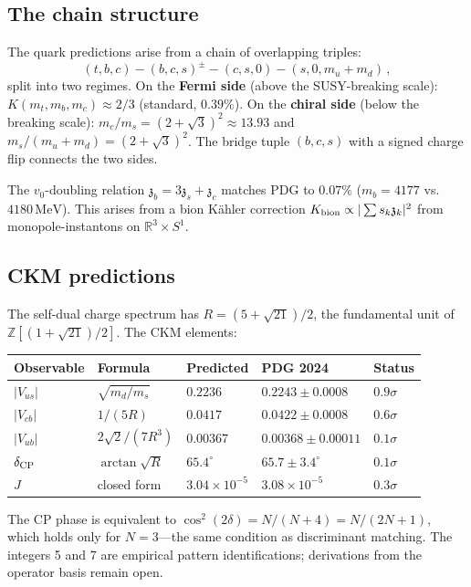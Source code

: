 \documentclass[12pt,a4paper]{article}
\newcommand{\MeV}{\,\mathrm{MeV}}
\newcommand{\zch}{\mathfrak{z}}
\begin{document}
\subsection{The chain structure}

The quark predictions arise from a chain of overlapping triples:
\begin{equation}
  (t,b,c) - (b,c,s)^{\pm} - (c,s,0) - (s,0,m_u{+}m_d)\,,
  \label{eq:chain}
\end{equation}
split into two regimes.
On the \textbf{Fermi side} (above the SUSY-breaking scale):
$K(m_t, m_b, m_c) \approx 2/3$ (standard, $0.39\%$).
On the \textbf{chiral side} (below the breaking scale):
$m_c/m_s = (2{+}\sqrt{3})^2 \approx 13.93$ and
$m_s/(m_u{+}m_d) = (2{+}\sqrt{3})^2$.
The bridge tuple $(b,c,s)$ with a signed charge flip connects
the two sides.

The $v_0$-doubling relation
$\zch_b = 3\zch_s + \zch_c$ matches
PDG to $0.07\%$ ($m_b = 4177$ vs.\ $4180\MeV$).
This arises from a bion K\"ahler correction
$K_{\rm bion} \propto |\sum s_k \zch_k|^2$ from
monopole-instantons on $\mathbb{R}^3 \times S^1$.

\subsection{CKM predictions}

The self-dual charge spectrum has $R = (5+\sqrt{21})/2$,
the fundamental unit of $\mathbb{Z}[(1+\sqrt{21})/2]$.
The CKM elements:
\begin{center}
\begin{tabular}{lllll}
\toprule
Observable & Formula & Predicted & PDG 2024 & Status \\
\midrule
$|V_{us}|$ & $\sqrt{m_d/m_s}$ & $0.2236$ & $0.2243 \pm 0.0008$ & $0.9\sigma$ \\
$|V_{cb}|$ & $1/(5R)$ & $0.0417$ & $0.0422 \pm 0.0008$ & $0.6\sigma$ \\
$|V_{ub}|$ & $2\sqrt{2}/(7R^3)$ & $0.00367$ & $0.00368 \pm 0.00011$ & $0.1\sigma$ \\
$\delta_{\rm CP}$ & $\arctan\sqrt{R}$ & $65.4^\circ$ & $65.7 \pm 3.4^\circ$ & $0.1\sigma$ \\
$J$ & closed form & $3.04 \times 10^{-5}$ & $3.08 \times 10^{-5}$ & $0.3\sigma$ \\
\bottomrule
\end{tabular}
\end{center}
The CP phase is equivalent to
$\cos^2(2\delta) = N/(N{+}4) = N/(2N{+}1)$, which holds
only for $N = 3$---the same condition as discriminant matching.
The integers 5 and 7 are empirical pattern identifications;
derivations from the operator basis remain open.
\end{document}
